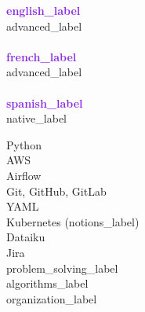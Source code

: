 \documentclass[9pt]{developercv} %
\begin{document}
    \begin{minipage}[t]{1\textwidth} %
        \vspace{0pt} %
        \begin{minipage}[t]{0.275\textwidth} %
            \vspace{0pt} %

            \begin{minipage}[t]{1\textwidth}
                \vspace{1.15\baselineskip}

                {\textcolor{BlueViolet}{\textbf{{{english_label}}}}\\\footnotesize{{{advanced_label}}}} \\ \\
                {\textcolor{BlueViolet}{\textbf{{{french_label}}}}\\\footnotesize{{{advanced_label}}}} \\ \\
                {\textcolor{BlueViolet}{\textbf{{{spanish_label}}}}\\\footnotesize{{{native_label}}}}
            \end{minipage}
        \end{minipage}
        \hfill
        \begin{minipage}[t]{0.725\textwidth} %
            \vspace{0pt} %


            \begin{minipage}[t]{0.45\textwidth} %
                \vspace{0pt} %
                Python \\
                AWS \\
                Airflow \\
                Git, GitHub, GitLab \\
                YAML \\
                Kubernetes ({{notions_label}}) \\
                Dataiku \\
                Jira \\
                {{problem_solving_label}} \\
                {{algorithms_label}} \\
                {{organization_label}}


\end{minipage}
\end{minipage}
\end{minipage}
\end{document}
